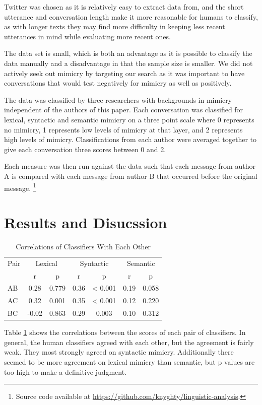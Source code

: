 \documentclass[conference]{IEEEtran}
\begin{document}
Twitter was chosen as it is relatively easy to extract data from, and the short utterance and conversation length make it more reasonable for humans to classify, as with longer texts they may find more difficulty in keeping less recent utterances in mind while evaluating more recent ones. 

The data set is small, which is both an advantage as it is possible to classify the data manually and a disadvantage in that the sample size is smaller. We did not actively seek out mimicry by targeting our search as it was important to have conversations that would test negatively for mimicry as well as positively.

The data was classified by three researchers with backgrounds in mimicry independent of the authors of  this paper. Each  conversation was classified for lexical, syntactic and semantic mimicry on a three point scale  where 0 represents no mimicry, 1 represents low levels of mimicry at that layer, and 2 represents high  levels of mimicry. Classifications from each author were averaged together to give each conversation three scores between 0 and 2.

Each measure was then run against the data such that each message from author A is compared with each  message from author B that occurred before the original message. \footnote{Source code available at \url{https://github.com/knyghty/linguistic-analysis}.}


\section{Results and Disucssion}

\begin{table}[!t]
\caption{Correlations of Classifiers With Each Other}
\label{classifiers}
\centering
\renewcommand{\arraystretch}{1.2}
\begin{tabular}{l | c c | c c | c c}
Pair & \multicolumn{2}{|c|}{Lexical} & \multicolumn{2}{|c|}{Syntactic} & \multicolumn{2}{|c}{Semantic} \\
 & r & p & r & p & r & p \\
\hline
AB & 0.28 & 0.779 & 0.36 & < 0.001 & 0.19 & 0.058 \\
AC & 0.32 & 0.001 & 0.35 & < 0.001 & 0.12 & 0.220 \\
BC & -0.02 & 0.863 & 0.29 & 0.003 & 0.10 & 0.312
\end{tabular}
\end{table}

Table \ref{classifiers} shows the correlations between the scores of each pair of classifiers. In general, the human classifiers agreed with each other, but the agreement is fairly weak. They most strongly agreed on syntactic mimicry. Additionally there seemed to be more agreement on lexical mimicry than semantic, but p values are too high to make a definitive judgment.
\end{document}
